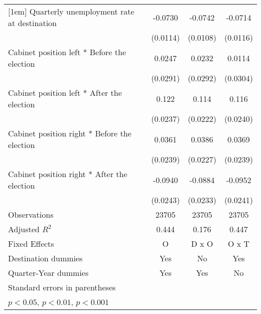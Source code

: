 \begin{table}[htbp]
\begin{tabular}{l*{3}{c}}
[1em]
Quarterly unemployment rate at destination&     -0.0730\sym{***}&     -0.0742\sym{***}&     -0.0714\sym{***}\\
                    &    (0.0114)         &    (0.0108)         &    (0.0116)         \\
[1em]
Cabinet position left * Before the election&      0.0247         &      0.0232         &      0.0114         \\
                    &    (0.0291)         &    (0.0292)         &    (0.0304)         \\
[1em]
Cabinet position left * After the election&       0.122\sym{***}&       0.114\sym{***}&       0.116\sym{***}\\
                    &    (0.0237)         &    (0.0222)         &    (0.0240)         \\
[1em]
Cabinet position right * Before the election&      0.0361         &      0.0386         &      0.0369         \\
                    &    (0.0239)         &    (0.0227)         &    (0.0239)         \\
[1em]
Cabinet position right * After the election&     -0.0940\sym{***}&     -0.0884\sym{***}&     -0.0952\sym{***}\\
                    &    (0.0243)         &    (0.0233)         &    (0.0241)         \\
\hline
Observations        &       23705         &       23705         &       23705         \\
Adjusted \(R^{2}\)  &       0.444         &       0.176         &       0.447         \\
Fixed Effects       &           O         &       D x O         &       O x T         \\
Destination dummies &         Yes         &          No         &         Yes         \\
Quarter-Year dummies&         Yes         &         Yes         &          No         \\
\hline\hline
\multicolumn{4}{l}{\footnotesize Standard errors in parentheses}\\
\multicolumn{4}{l}{\footnotesize \sym{*} \(p<0.05\), \sym{**} \(p<0.01\), \sym{***} \(p<0.001\)}\\
\end{tabular}
\label{tab:main_results}
\end{table}
